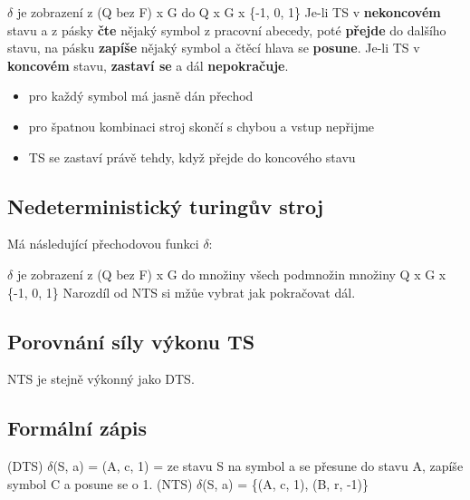 \documentclass{szzclass}
\begin{document}
$\delta$ je zobrazení z (Q bez F) x G do Q x G x \{-1, 0, 1\}
\newline
Je-li TS v \textbf{nekoncovém} stavu a z pásky \textbf{čte} nějaký symbol z pracovní abecedy, poté \textbf{přejde} do dalšího stavu, na pásku \textbf{zapíše} nějaký symbol
a čtěcí hlava se \textbf{posune}.
\newline
Je-li TS v \textbf{koncovém} stavu, \textbf{zastaví se} a dál \textbf{nepokračuje}.
\newline
\begin{itemize}
	\item pro každý symbol má jasně dán přechod
	\item pro špatnou kombinaci stroj skončí s chybou a vstup nepřijme
	\item TS se zastaví právě tehdy, když přejde do koncového stavu
\end{itemize}

\subsection{Nedeterministický turingův stroj}
Má následující přechodovou funkci $\delta$:

$\delta$ je zobrazení z (Q bez F) x G do množiny všech podmnožin množiny Q x G x \{-1, 0, 1\}
\newline
\newline
Narozdíl od NTS si mžůe vybrat jak pokračovat dál.

\subsection{Porovnání síly výkonu TS}
NTS je stejně výkonný jako DTS.
\subsection{Formální zápis}
(DTS) $\delta$(S, a) = (A, c, 1) = ze stavu S na symbol a se přesune do stavu A, zapíše symbol C a posune se o 1.
\newline
(NTS) $\delta$(S, a) = \{(A, c, 1), (B, r, -1)\}
\end{document}
